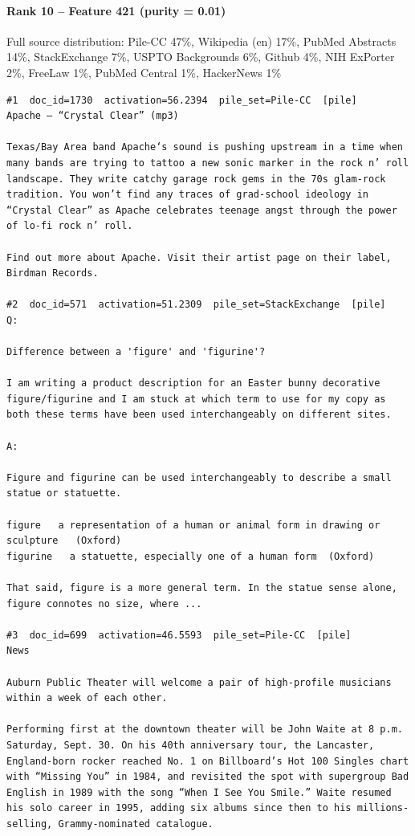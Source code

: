 \paragraph*{Rank 10 -- Feature 421 (purity = 0.01)}

Full source distribution: Pile-CC 47\%, Wikipedia (en) 17\%, PubMed Abstracts 14\%, StackExchange 7\%, USPTO Backgrounds 6\%, Github 4\%, NIH ExPorter 2\%, FreeLaw 1\%, PubMed Central 1\%, HackerNews 1\%

\begin{verbatim}
#1  doc_id=1730  activation=56.2394  pile_set=Pile-CC  [pile]
Apache – “Crystal Clear” (mp3)

Texas/Bay Area band Apache‘s sound is pushing upstream in a time when many bands are trying to tattoo a new sonic marker in the rock n’ roll landscape. They write catchy garage rock gems in the 70s glam-rock tradition. You won’t find any traces of grad-school ideology in “Crystal Clear” as Apache celebrates teenage angst through the power of lo-fi rock n’ roll.

Find out more about Apache. Visit their artist page on their label, Birdman Records.

#2  doc_id=571  activation=51.2309  pile_set=StackExchange  [pile]
Q:

Difference between a 'figure' and 'figurine'?

I am writing a product description for an Easter bunny decorative figure/figurine and I am stuck at which term to use for my copy as both these terms have been used interchangeably on different sites. 

A:

Figure and figurine can be used interchangeably to describe a small statue or statuette.

figure   a representation of a human or animal form in drawing or sculpture   (Oxford)
figurine   a statuette, especially one of a human form  (Oxford)

That said, figure is a more general term. In the statue sense alone, figure connotes no size, where ...

#3  doc_id=699  activation=46.5593  pile_set=Pile-CC  [pile]
News

Auburn Public Theater will welcome a pair of high-profile musicians within a week of each other.

Performing first at the downtown theater will be John Waite at 8 p.m. Saturday, Sept. 30. On his 40th anniversary tour, the Lancaster, England-born rocker reached No. 1 on Billboard’s Hot 100 Singles chart with “Missing You” in 1984, and revisited the spot with supergroup Bad English in 1989 with the song “When I See You Smile.” Waite resumed his solo career in 1995, adding six albums since then to his millions-selling, Grammy-nominated catalogue.


\end{verbatim}

